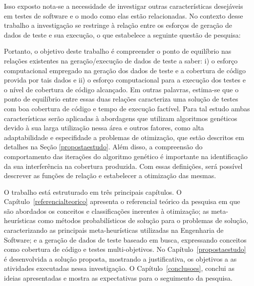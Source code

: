 Isso exposto nota-se a necessidade de investigar outras características desejáveis em testes de software e o modo como elas estão relacionadas. No contexto desse trabalho a investigação se restringe à relação entre os esforços de geração de dados de teste e sua execução, o que estabelece a seguinte questão de pesquisa:

 
\vspace{1.0cm}
\vspace{1.0cm}


Portanto, o objetivo deste trabalho é compreender o ponto de equilíbrio nas relações existentes na geração/execução de dados de teste a saber: i) o esforço computacional empregado na geração dos dados de teste e a cobertura de código provida por tais dados e ii) o esforço computacional para a execução dos testes e o nível de cobertura de código alcançado. Em outras palavras, estima-se que o ponto de equilíbrio entre essas duas relações caracteriza  uma solução de testes com boa cobertura de código e tempo de execução factível. Para tal estudo ambas características serão aplicadas à abordagens que utilizam algoritmos genéticos devido à sua larga utilização nessa área e outros fatores, como alta adaptabilidade e especifidade a problemas de otimização, que estão descritos em detalhes na Seção \ref{propostaestudo}. Além disso, a compreensão do comportamento das iterações do algoritmo genético é importante na identificação da sua interferência na cobertura produzida. Com essas definições, será possível descrever as funções de relação e estabelecer a otimização das mesmas. 


O trabalho está estruturado em três principais capítulos. O Capítulo~\ref{referencialteorico} apresenta o referencial teórico da pesquisa em que são abordados os conceitos e classificações inerentes à otimização; as meta-heurísticas como métodos probabilísticos de solução para o problemas de solução, caracterizando as principais meta-heurísticas utilizadas na Engenharia de Software; e a geração de dados de teste baseado em busca, expressando conceitos como cobertura de código e testes multi-objetivos. No Capítulo~\ref{propostaestudo} é desenvolvida a solução proposta, mostrando a justificativa, os objetivos a as atividades executadas nessa investigação. O Capítulo~\ref{conclusoes}, conclui as ideias apresentadas e mostra as expectativas para o seguimento da pesquisa.
